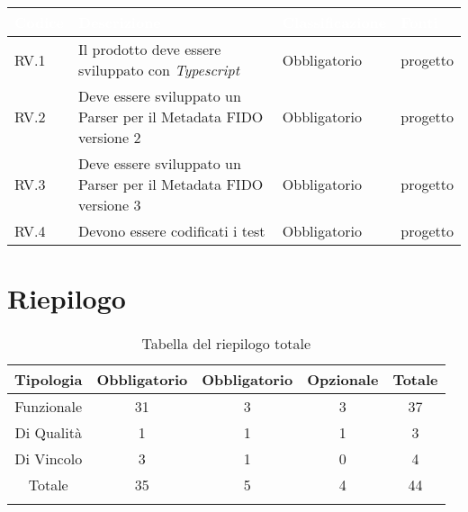 \begin{center}
  \centering
  \begin{longtable}{|L{2cm}|C{5,5cm}|C{3cm}|C{2cm}|}
    \hline
    \textcolor[HTML]{FFFFFF}{\textbf{Codice}} & \textcolor[HTML]{FFFFFF}{\textbf{Descrizione}} & \textcolor[HTML]{FFFFFF}{\textbf{Classificazione}} & \textcolor[HTML]{FFFFFF}{\textbf{Fonti}}
    \\ \hline
    RV.1 & Il prodotto deve essere sviluppato con \textit{Typescript} & Obbligatorio & progetto \\ \hline
    RV.2 & Deve essere sviluppato un Parser per il Metadata FIDO versione 2 & Obbligatorio & progetto \\ \hline
    RV.3 & Deve essere sviluppato un Parser per il Metadata FIDO versione 3 & Obbligatorio & progetto \\ \hline
    RV.4 & Devono essere codificati i test & Obbligatorio & progetto \\ \hline
  \end{longtable}
\end{center}


\section{Riepilogo}

\begin{center}
  \centering
  \begin{longtable}{|c|c|c|c|c|}
    \hline
    \rowcolor[HTML]{036400}
    {\color[HTML]{FFFFFF} \textbf{Tipologia}} & {\color[HTML]{FFFFFF} \textbf{Obbligatorio}} & {\color[HTML]{FFFFFF} \textbf{Obbligatorio}} & {\color[HTML]{FFFFFF} \textbf{Opzionale}}  & {\color[HTML]{FFFFFF} \textbf{Totale}} \\ \hline
    \rowcolor[HTML]{EFEFEF}
    Funzionale & 31 & 3 & 3 & 37 \\ \hline
    \rowcolor[HTML]{C0C0C0}
    Di Qualità & 1 & 1 & 1 & 3 \\ \hline
    \rowcolor[HTML]{EFEFEF}
    Di Vincolo & 3 & 1 & 0 & 4 \\ \hline
    \rowcolor[HTML]{C0C0C0}
    Totale & 35 & 5 & 4 & 44 \\ \hline
    \caption{Tabella del riepilogo totale}
  \end{longtable}
\end{center}